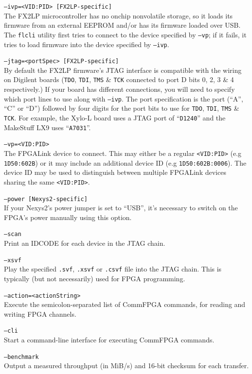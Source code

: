 \begin{desc}
  \item[\texttt{--ivp=<VID:PID> [FX2LP-specific]}] \hfill \\
    The FX2LP microcontroller has no onchip nonvolatile storage, so it loads its firmware from an external EEPROM and/or has its firmware loaded over USB. The \texttt{flcli} utility first tries to connect to the device specified by \texttt{--vp}; if it fails, it tries to load firmware into the device specified by \texttt{--ivp}.
  \item[\texttt{--jtag=<portSpec> [FX2LP-specific]}] \hfill \\
    By default the FX2LP firmware's JTAG interface is compatible with the wiring on Digilent boards (\texttt{TDO}, \texttt{TDI}, \texttt{TMS} \& \texttt{TCK} connected to port D bits 0, 2, 3 \& 4 respectively.) If your board has different connections, you will need to specify which port lines to use along with \texttt{--ivp}. The port specification is the port (``A'', ``C'' or ``D'') followed by four digits for the port bits to use for \texttt{TDO}, \texttt{TDI}, \texttt{TMS} \& \texttt{TCK}. For example, the Xylo-L board uses a JTAG port of ``\texttt{D1240}'' and the MakeStuff LX9 uses ``\texttt{A7031}''.
  \item[\texttt{--vp=<VID:PID>}] \hfill \\
    The FPGALink device to connect. This may either be a regular \texttt{<VID:PID>} (e.g \texttt{1D50:602B}) or it may include an additional device ID (e.g \texttt{1D50:602B:0006}). The device ID may be used to distinguish between multiple FPGALink devices sharing the same \texttt{<VID:PID>}.
  \item[\texttt{--power [Nexys2-specific]}] \hfill \\
    If your Nexys2's power jumper is set to ``USB'', it's necessary to switch on the FPGA's power manually using this option.
  \item[\texttt{--scan}] \hfill \\
    Print an IDCODE for each device in the JTAG chain.
  \item[\texttt{--xsvf}] \hfill \\
    Play the specified \texttt{.svf}, \texttt{.xsvf} or \texttt{.csvf} file into the JTAG chain. This is typically (but not necessarily) used for FPGA programming.
  \item[\texttt{--action=<actionString>}] \hfill \\
    Execute the semicolon-separated list of CommFPGA commands, for reading and writing FPGA channels.
  \item[\texttt{--cli}] \hfill \\
    Start a command-line interface for executing CommFPGA commands.
  \item[\texttt{--benchmark}] \hfill \\
    Output a measured throughput (in MiB/s) and 16-bit checksum for each transfer.
\end{desc}

